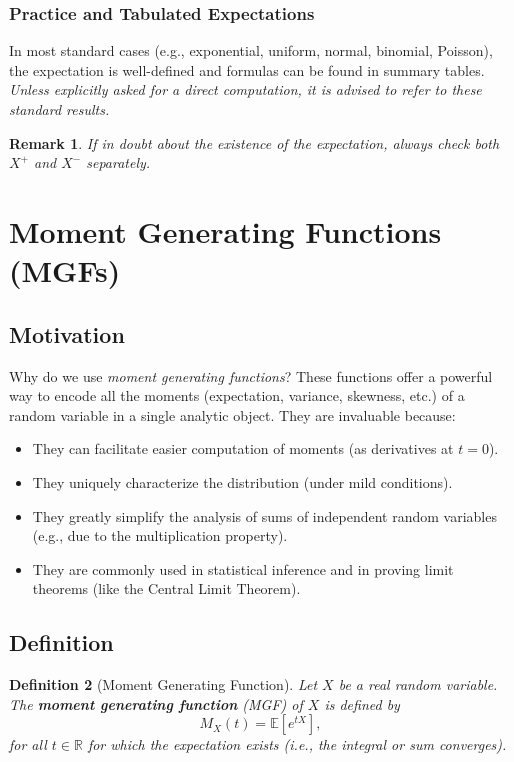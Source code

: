 \documentclass[12pt]{article}
\newtheorem{definition}{Definition}[section]
\newtheorem{remark}[definition]{Remark}
\begin{document}
\subsubsection*{Practice and Tabulated Expectations}

In most standard cases (e.g., exponential, uniform, normal, binomial, Poisson), the expectation is well-defined and formulas can be found in summary tables. \emph{Unless explicitly asked for a direct computation, it is advised to refer to these standard results.}

\begin{remark}
    If in doubt about the existence of the expectation, always check both $X^+$ and $X^-$ separately.
\end{remark}

\section{Moment Generating Functions (MGFs)}
\subsection{Motivation}

Why do we use \emph{moment generating functions}? These functions offer a powerful way to encode all the moments (expectation, variance, skewness, etc.) of a random variable in a single analytic object. They are invaluable because:

\begin{itemize}
    \item They can facilitate easier computation of moments (as derivatives at $t=0$).
    \item They uniquely characterize the distribution (under mild conditions).
    \item They greatly simplify the analysis of sums of independent random variables (e.g., due to the multiplication property).
    \item They are commonly used in statistical inference and in proving limit theorems (like the Central Limit Theorem).
\end{itemize}

\subsection{Definition}

\begin{definition}[Moment Generating Function]
    Let $X$ be a real random variable. The \textbf{moment generating function} (MGF) of $X$ is defined by
    \[
        M_X(t) = \mathbb{E}\left[e^{tX}\right],
    \]
    for all $t \in \mathbb{R}$ for which the expectation exists (i.e., the integral or sum converges).
\end{definition}
\end{document}
